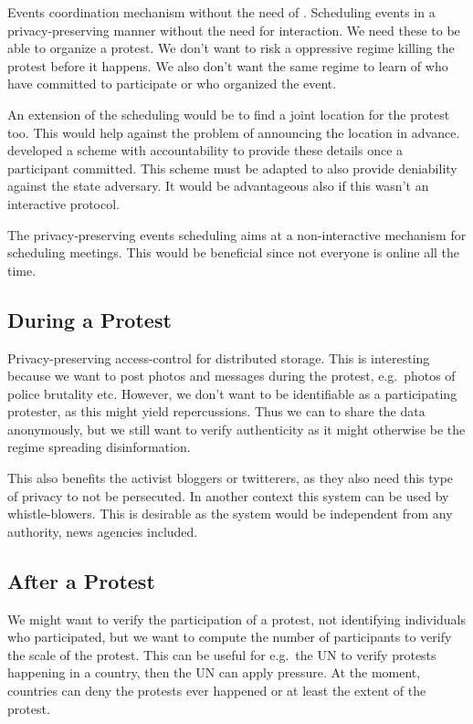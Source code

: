 \documentclass[a4paper]{llncs}
\begin{document}
Events coordination mechanism without the need of .
Scheduling events in a privacy-preserving manner without the need for 
interaction.
We need these to be able to organize a protest.
We don't want to risk a oppressive regime killing the protest before it 
happens.
We also don't want the same regime to learn of who have committed to 
participate or who organized the event.

An extension of the scheduling would be to find a joint location for the 
protest too.
This would help against the problem of announcing the location in advance.
\citet{EventsInivations} developed a scheme with accountability to provide 
these details once a participant committed.
This scheme must be adapted to also provide deniability against the state 
adversary.
It would be advantageous also if this wasn't an interactive protocol.

The privacy-preserving events scheduling aims at a non-interactive mechanism 
for scheduling meetings.
This would be beneficial since not everyone is online all the time.


\subsection{During a Protest}

Privacy-preserving access-control for distributed storage.
This is interesting because we want to post photos and messages during the 
protest, e.g.\ photos of police brutality etc.
However, we don't want to be identifiable as a participating protester, as this 
might yield repercussions.
Thus we can to share the data anonymously, but we still want to verify 
authenticity as it might otherwise be the regime spreading disinformation.

This also benefits the activist bloggers or twitterers, as they also need this 
type of privacy to not be persecuted.
In another context this system can be used by whistle-blowers.
This is desirable as the system would be independent from any authority, news 
agencies included.


\subsection{After a Protest}

We might want to verify the participation of a protest, not identifying 
individuals who participated, but we want to compute the number of participants 
to verify the scale of the protest.
This can be useful for e.g.\ the UN to verify protests happening in a country, 
then the UN can apply pressure.
At the moment, countries can deny the protests ever happened or at least the 
extent of the protest.
\end{document}
